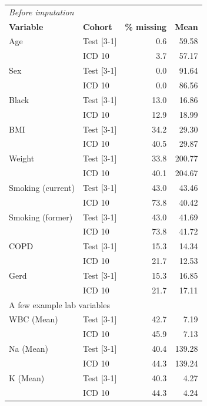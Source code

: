 \documentclass[english]{article}
\begin{document}
\begin{table}[h]
\centering
\begin{tabular}{llrr}
\toprule
\multicolumn{4}{l}{\textit{Before imputation}}\\
\textbf{Variable} & \textbf{Cohort} & \textbf{\% missing} & \textbf{Mean} \\
\midrule
Age 			&	Test [3-1]	&	0.6		&		59.58 	\\
			& 	ICD 10		& 	3.7		&		57.17	\\ 
\addlinespace
Sex 			&	Test [3-1]	&	0.0		&		91.64 	\\
			& 	ICD 10		& 	0.0		&		86.56	\\ 
\addlinespace
Black		&	Test [3-1]	&	13.0		&		16.86 	\\
			& 	ICD 10		& 	12.9		&		18.99	\\ 
\addlinespace
BMI 			&	Test [3-1]	&	34.2		&		29.30 	\\
			& 	ICD 10		& 	40.5		&		29.87	\\ 
\addlinespace
Weight		&	Test [3-1]	&	33.8		&		200.77	\\
			& 	ICD 10		& 	40.1		&		204.67	\\
\addlinespace
Smoking (current)			
			&	Test [3-1]	&	43.0		&		43.46 	\\
			& 	ICD 10		& 	73.8		&		40.42	\\ 
\addlinespace
Smoking (former)			
			&	Test [3-1]	&	43.0		&		41.69 	\\
			& 	ICD 10		& 	73.8		&		41.72	\\  
\addlinespace
COPD			&	Test [3-1]	&	15.3		&		14.34 	\\
			& 	ICD 10		& 	21.7		&		12.53	\\
\addlinespace
Gerd			&	Test [3-1]	&	15.3		&		16.85 	\\
			& 	ICD 10		& 	21.7		&		17.11	\\ 
			
			
\midrule
\multicolumn{4}{l}{A few example lab variables}\\\addlinespace
WBC (Mean)	&	Test [3-1]	&	42.7		&		7.19 	\\
			& 	ICD 10		& 	45.9		&		7.13		\\ 
\addlinespace
Na (Mean)	&	Test [3-1]	&	40.4		&		139.28 	\\
			& 	ICD 10		& 	44.3		&		139.24	\\ 
\addlinespace
K (Mean)		&	Test [3-1]	&	40.3		&		4.27 	\\
			& 	ICD 10		& 	44.3		&		4.24		\\ 

\bottomrule
\end{tabular}
\end{table}
\end{document}
